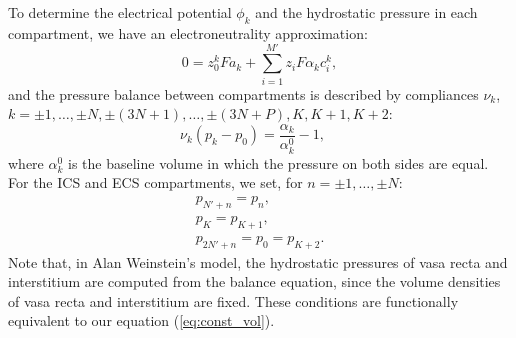 \documentclass{article}
\begin{document}
To determine the electrical potential $\phi_k$ and the hydrostatic pressure in each compartment, we have an electroneutrality approximation:
\begin{equation}
     0=z_0^k Fa_k+\sum_{i=1}^{M'}z_iF \alpha_k c_i^k,
\end{equation}
and the pressure balance between compartments is described by compliances $\nu_k$, $k=\pm 1,\dots,\pm N,\pm(3N+1),\dots,\pm(3N+P),K,K+1,K+2$:
\begin{equation}
    \nu_k(p_k - p_0) = \frac{\alpha_k}{\alpha_k^0}-1,\quad 
\end{equation}
where $\alpha_k^0$ is the baseline volume in which the pressure on both sides are equal.
For the ICS and ECS compartments, we set, for $n=\pm 1,\dots,\pm N$:
\begin{gather}
    p_{N'+n} = p_n,\\
    p_K = p_{K+1},\\
    p_{2N'+n} = p_0 = p_{K+2}.
\end{gather}
Note that, in Alan Weinstein's model, the hydrostatic pressures of vasa recta and interstitium are computed from the balance equation, since the volume densities of vasa recta and interstitium are fixed.
These conditions are functionally equivalent to our equation (\ref{eq:const_vol}).
\end{document}
